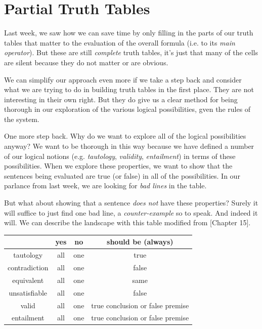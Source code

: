 
\section{Partial Truth Tables}


Last week, we saw how we can save time by only filling in the parts of our
truth tables that matter to the evaluation of the overall formula (i.e.
to its \emph{main operator}). But these are still \emph{complete} truth tables,
it's just that many of the cells are silent because they do not matter or are
obvious.

We can simplify our approach even more if we take a step back and consider what
we are trying to do in building truth tables in the first place. They are not
interesting in their own right. But they do give us a clear method for being
thorough in our exploration of the various logical possibilities, gven the rules
of the system.

One more step back. Why do we want to explore all of the logical possibilities
anyway? We want to be thorough in this way because we have defined a number of
our logical notions (e.g. \emph{tautology}, \emph{validity}, \emph{entailment})
in terms of these possibilities. When we explore these properties, we want to
show that the sentences being evaluated are true (or false) in all of the
possibilities. In our parlance from last week, we are looking for \emph{bad
lines} in the table.

But what about showing that a sentence \emph{does not} have these properties?
Surely it will suffice to just find one bad line, a \emph{counter-example} so
to speak. And indeed it will. We can describe the landscape with this table
modified from \cite{Mag25}[Chapter 15].

\begin{center}
  \begin{tabular}{c c c c}
                  & \bf{yes} & \bf{no} & should be (always)     \\
    \hline
    tautology     &  all     &  one    & true                   \\
    contradiction &  all     &  one    & false                  \\
    \hline
    equivalent    &  all     &  one    & same                   \\
    unsatisfiable &  all     &  one    & false                  \\
    \hline
    valid         &  all     &  one    & true conclusion or false premise  \\
    entailment    &  all     &  one    & true conclusion or false premise  \\
  \end{tabular}
\end{center}

